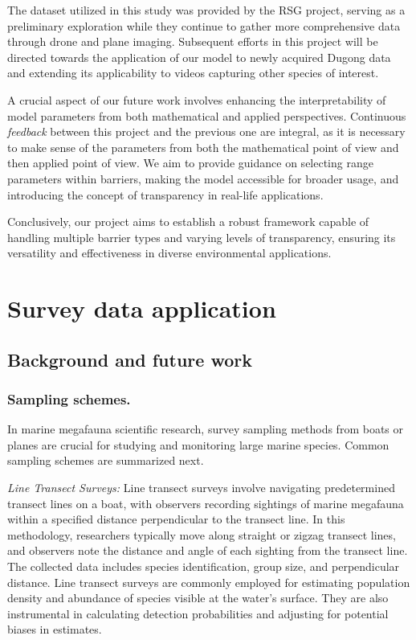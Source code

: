\documentclass[
]{book}
\begin{document}
The dataset utilized in this study was provided by the RSG project, serving as a preliminary exploration while they continue to gather more comprehensive data through drone and plane imaging. Subsequent efforts in this project will be directed towards the application of our model to newly acquired Dugong data and extending its applicability to videos capturing other species of interest.

A crucial aspect of our future work involves enhancing the interpretability of model parameters from both mathematical and applied perspectives. Continuous \emph{feedback} between this project and the previous one are integral, as it is necessary to make sense of the parameters from both the mathematical point of view and then applied point of view. We aim to provide guidance on selecting range parameters within barriers, making the model accessible for broader usage, and introducing the concept of transparency in real-life applications.

Conclusively, our project aims to establish a robust framework capable of handling multiple barrier types and varying levels of transparency, ensuring its versatility and effectiveness in diverse environmental applications.

\hypertarget{survey-data-application}{%
\chapter{Survey data application}\label{survey-data-application}}

\hypertarget{background-and-future-work}{%
\section{Background and future work}\label{background-and-future-work}}

\hypertarget{sampling-schemes.}{%
\subsection{Sampling schemes.}\label{sampling-schemes.}}

In marine megafauna scientific research, survey sampling methods from boats or planes are crucial for studying and monitoring large marine species. Common sampling schemes are summarized next.

\emph{Line Transect Surveys:} Line transect surveys involve navigating predetermined transect lines on a boat, with observers recording sightings of marine megafauna within a specified distance perpendicular to the transect line. In this methodology, researchers typically move along straight or zigzag transect lines, and observers note the distance and angle of each sighting from the transect line. The collected data includes species identification, group size, and perpendicular distance. Line transect surveys are commonly employed for estimating population density and abundance of species visible at the water's surface. They are also instrumental in calculating detection probabilities and adjusting for potential biases in estimates.
\end{document}
